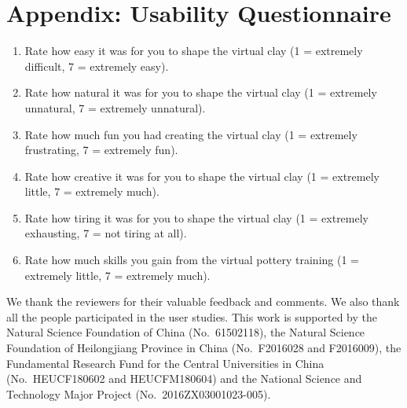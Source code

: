 \documentclass{svjour3}                     %
\begin{document}
{\section*{Appendix: Usability Questionnaire}

\begin{enumerate}
\item Rate how easy it was for you to shape the virtual clay (1 = extremely difficult, 7 = extremely easy).
\item Rate how natural it was for you to shape the virtual clay (1 = extremely unnatural, 7 = extremely unnatural).
\item Rate how much fun you had creating the virtual clay (1 = extremely frustrating, 7 = extremely fun).
\item Rate how creative it was for you to shape the virtual clay (1 = extremely little, 7 = extremely much).
\item Rate how tiring it was for you to shape the virtual clay (1 = extremely exhausting, 7 = not tiring at all).
\item Rate how much skills you gain from the virtual pottery training (1 = extremely little, 7 = extremely much).

\end{enumerate}

}

\begin{acknowledgements}
{\color{blue}
We thank the reviewers for their valuable feedback and comments. 
%
We also thank all the people participated in the user studies.
}
%
This work is supported by the Natural Science Foundation of China (No.~61502118), the Natural Science Foundation of Heilongjiang Province in China (No.~F2016028 and F2016009), the Fundamental Research Fund for the Central Universities in China (No.~HEUCF180602 and HEUCFM180604) and the National Science and Technology Major Project (No.~2016ZX03001023-005).
\end{acknowledgements}


%
%
\end{document}
